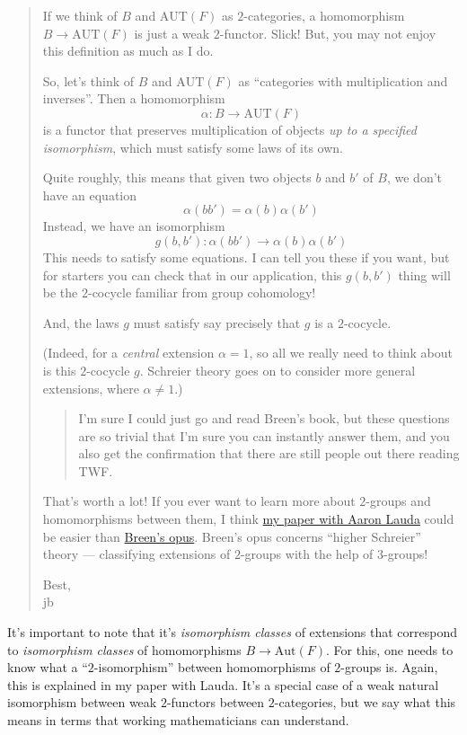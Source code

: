 \documentclass{article}
\begin{document}
\begin{quote}
If we think of \(B\) and \(\mathrm{AUT}(F)\) as \(2\)-categories, a
homomorphism \(B \to \mathrm{AUT}(F)\) is just a weak \(2\)-functor.
Slick! But, you may not enjoy this definition as much as I do.

So, let's think of \(B\) and \(\mathrm{AUT}(F)\) as ``categories with
multiplication and inverses''. Then a homomorphism
\[\alpha\colon B \to \mathrm{AUT}(F)\] is a functor that preserves
multiplication of objects \emph{up to a specified isomorphism}, which
must satisfy some laws of its own.

Quite roughly, this means that given two objects \(b\) and \(b'\) of
\(B\), we don't have an equation \[\alpha(bb') = \alpha(b) \alpha(b')\]
Instead, we have an isomorphism
\[g(b,b')\colon \alpha(bb') \to \alpha(b) \alpha(b')\] This needs to
satisfy some equations. I can tell you these if you want, but for
starters you can check that in our application, this \(g(b,b')\) thing
will be the \(2\)-cocycle familiar from group cohomology!

And, the laws \(g\) must satisfy say precisely that \(g\) is a
\(2\)-cocycle.

(Indeed, for a \emph{central} extension \(\alpha = 1\), so all we really
need to think about is this \(2\)-cocycle \(g\). Schreier theory goes on
to consider more general extensions, where \(\alpha \neq 1\).)

\begin{quote}
I'm sure I could just go and read Breen's book, but these questions are
so trivial that I'm sure you can instantly answer them, and you also get
the confirmation that there are still people out there reading TWF.
\end{quote}

That's worth a lot! If you ever want to learn more about \(2\)-groups
and homomorphisms between them, I think
\href{http://arxiv.org/abs/math.QA/0307200}{my paper with Aaron Lauda}
could be easier than
\href{http://www.numdam.org/numdam-bin/feuilleter?id=ASENS_1992_4_25_5}{Breen's
opus}. Breen's opus concerns ``higher Schreier'' theory --- classifying
extensions of \(2\)-groups with the help of \(3\)-groups!

Best,\\
jb
\end{quote}

It's important to note that it's \emph{isomorphism classes} of
extensions that correspond to \emph{isomorphism classes} of
homomorphisms \(B \to \mathrm{Aut}(F)\). For this, one needs to know
what a ``\(2\)-isomorphism'' between homomorphisms of \(2\)-groups is.
Again, this is explained in my paper with Lauda. It's a special case of
a weak natural isomorphism between weak \(2\)-functors between
\(2\)-categories, but we say what this means in terms that working
mathematicians can understand.
\end{document}
